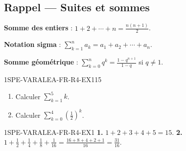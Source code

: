
\subsection*{Rappel — Suites et sommes}

\textbf{Somme des entiers} : $1 + 2 + \cdots + n = \frac{n(n+1)}{2}$.

\textbf{Notation sigma} : $\sum_{k=1}^{n} a_k = a_1 + a_2 + \cdots + a_n$.

\textbf{Somme géométrique} : $\sum_{k=0}^{n} q^k = \frac{1-q^{n+1}}{1-q}$ si $q
\neq 1$.

\begin{exercice}{1SPE-VARALEA-FR-R4-EX1}{1}{5}
\begin{enumerate}
  \item Calculer $\sum_{k=1}^{5} k$.
  \item Calculer $\sum_{k=0}^{4} \left(\frac{1}{2}\right)^k$.
\end{enumerate}
\end{exercice}


\begin{corrige}{1SPE-VARALEA-FR-R4-EX1}
\textbf{1.} $1+2+3+4+5 = 15$.
\textbf{2.} $1 + \frac{1}{2} + \frac{1}{4} + \frac{1}{8} + \frac{1}{16} = \frac{16+8+4+2+1}{16} = \frac{31}{16}$.
\end{corrige}

